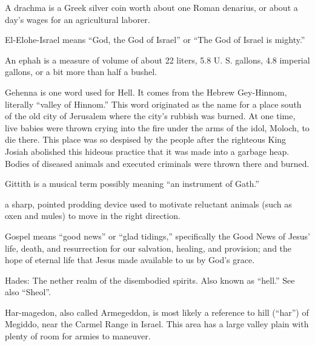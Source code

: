 {\par }{
\par }{\ILIB A drachma is a Greek silver coin worth about one Roman denarius, or about a day’s wages for an agricultural laborer.
\par }{
\par }{\ILIB El-Elohe-Israel means “God, the God of Israel” or “The God of Israel is mighty.”
\par }{
\par }{\ILIB An ephah is a measure of volume of about 22 liters, 5.8 U. S. gallons, 4.8 imperial gallons, or a bit more than half a bushel.
\par }{
\par }{\ILIB Gehenna is one word used for Hell. It comes from the Hebrew Gey-Hinnom, literally “valley of Hinnom.” This word originated as the name for a place south of the old city of Jerusalem where the city’s rubbish was burned. At one time, live babies were thrown crying into the fire under the arms of the idol, Moloch, to die there. This place was so despised by the people after the righteous King Josiah abolished this hideous practice that it was made into a garbage heap. Bodies of diseased animals and executed criminals were thrown there and burned.
\par }{
\par }{\ILIB Gittith is a musical term possibly meaning “an instrument of Gath.”
\par }{
\par }{\ILIB a sharp, pointed prodding device used to motivate reluctant animals (such as oxen and mules) to move in the right direction.
\par }{
\par }{\ILIB Gospel means “good news” or “glad tidings,” specifically the Good News of Jesus’ life, death, and resurrection for our salvation, healing, and provision; and the hope of eternal life that Jesus made available to us by God’s grace.
\par }{
\par }{\ILIB Hades: The nether realm of the disembodied spirits. Also known as “hell.” See also “Sheol”.
\par }{
\par }{\ILIB Har-magedon, also called Armegeddon, is most likely a reference to hill (“har”) of Megiddo, near the Carmel Range in Israel. This area has a large valley plain with plenty of room for armies to maneuver.
}
